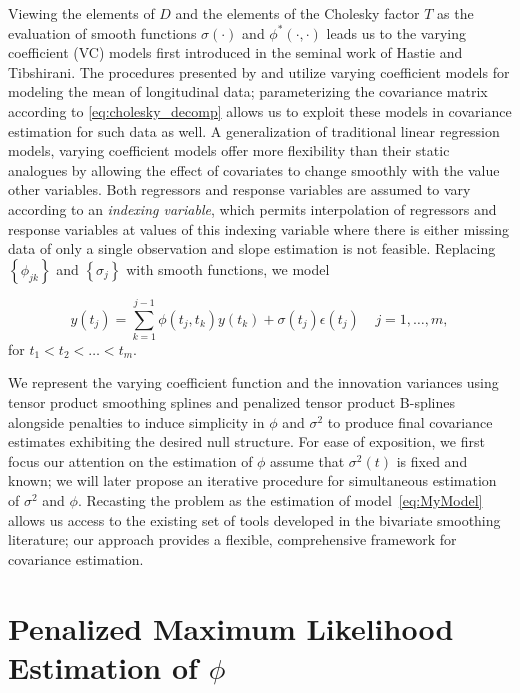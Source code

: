 \documentclass[12pt]{article}
\theoremstyle{definition}
\begin{document}
Viewing the elements of $D$ and the elements of the Cholesky factor $T$ as the evaluation of smooth functions $\sigma\left(\cdot\right)$ and $\phi^*\left(\cdot,\cdot\right)$ leads us to the varying coefficient (VC) models first introduced in the seminal work of Hastie and Tibshirani.  The procedures presented by \citet{fan2000two} and \citet{huang2002varying} utilize varying coefficient models for modeling the mean of longitudinal data; parameterizing the covariance matrix according to \ref{eq:cholesky_decomp} allows us to exploit these models in covariance estimation for such data as well.  A generalization of traditional linear regression models, varying coefficient models offer more flexibility than their static analogues by allowing the effect of covariates to change smoothly with the value other variables. Both regressors and response variables are assumed to vary according to an \emph{indexing variable}, which  permits interpolation of regressors and response variables at values of this indexing variable where there is either missing data of only a single observation and slope estimation is not feasible.  Replacing  $\left \{ \phi_{jk} \right\}$ and $\left\{ \sigma_j \right\}$ with smooth functions, we model 

\begin{equation}   
y\left(t_j \right)  = \sum_{k=1}^{j-1} \phi\left(t_j ,t_k\right) y\left(t_k\right) + \sigma\left(t_j\right)\epsilon\left({t_j}\right) \;\;\;\; j=1,\dots, m, 
\label{eq:MyModel} 
\end{equation}
\noindent for $t_1 < t_2 < \dots < t_m$. 

We represent the varying coefficient function and the innovation variances using tensor product smoothing splines and penalized tensor product B-splines alongside penalties to induce simplicity in $\phi$ and $\sigma^2$  to produce final covariance estimates exhibiting the desired null structure.  For ease of exposition, we first focus our attention on the estimation of $\phi$ assume that $\sigma^2\left(t\right)$ is fixed and known; we will later propose an iterative procedure for simultaneous estimation of $\sigma^2$ and $\phi$.    %
Recasting the problem as the estimation of model~\ref{eq:MyModel} allows us access to the existing set of tools developed in the bivariate smoothing literature; our approach provides a flexible, comprehensive framework for covariance estimation.


\section{Penalized Maximum Likelihood Estimation of $\phi$}
\end{document}
